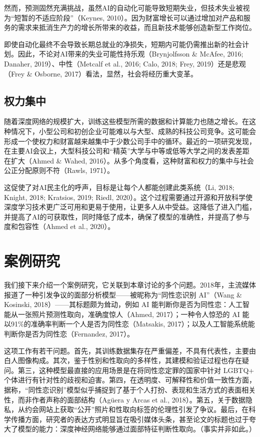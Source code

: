 \documentclass[lang=cn,newtx,10pt,scheme=chinese]{elegantbook}
\begin{document}
然而，预测固然充满挑战，虽然AI的自动化可能导致短期失业，但技术失业被视为“短暂的不适应阶段”（Keynes, 2010）。因为财富增长可以通过增加对产品和服务的需求来抵消生产力的增长所带来的收益，而且新技术能够创造新型工作岗位。

即使自动化最终不会导致长期总就业的净损失，短期内可能仍需推出新的社会计划。因此，不论对AI带来的失业可能性持乐观（Brynjolfsson \& McAfee, 2016; Danaher, 2019）、中性（Metcalf et al., 2016; Calo, 2018; Frey, 2019）还是悲观（Frey \& Osborne, 2017）看法，显然，社会将经历重大变革。

\subsection{权力集中}
随着深度网络的规模扩大，训练这些模型所需的数据和计算能力也随之增长。在这种情况下，小型公司和初创企业可能难以与大型、成熟的科技公司竞争。这可能会形成一个使权力和财富越来越集中于少数公司手中的循环。最近的一项研究发现，在主要AI会议上，大型科技公司和“精英”大学与中等或低等大学之间的发表差距在扩大（Ahmed \& Wahed, 2016）。从多个角度看，这种财富和权力的集中与社会公正分配原则不符（Rawls, 1971）。

这促使了对AI民主化的呼声，目标是让每个人都能创建此类系统（Li, 2018; Knight, 2018; Kratsios, 2019; Riedl, 2020）。这个过程需要通过开源和开放科学使深度学习技术更广泛可用和更易于使用，让更多人从中受益。这降低了进入门槛，并提高了AI的可获取性，同时降低了成本，确保了模型的准确性，并提高了参与度和包容性（Ahmed et al., 2020）。

\section{案例研究}
我们接下来介绍一个案例研究，它关联到本章讨论的多个问题。2018年，主流媒体报道了一种引发争议的面部分析模型——被昵称为“同性恋识别 AI”（Wang \& Kosinski, 2018）——其标题颇为耸动，例如 AI 能判断你是否为同性恋：人工智能从一张照片预测性取向，准确度惊人（Ahmed, 2017）；一种令人惊恐的 AI 能以91\%的准确率判断一个人是否为同性恋（Matsakis, 2017）；以及人工智能系统能判断你是否为同性恋（Fernandez, 2017）。

这项工作有若干问题。首先，其训练数据集存在严重偏差，不具有代表性，主要由白人图像构成。其次，鉴于性别和性取向的多样性，其建模和验证过程也存在疑问。第三，这种模型最直接的应用场景是在将同性恋定罪的国家中针对 LGBTQ+ 个体进行有针对性的歧视和迫害。第四，在透明度、可解释性和价值一致性方面，据称，“同性恋识别”模型似乎捕捉到了基于个人打扮、表现和生活方式的表面相关性，而非作者声称的面部结构（Agüera y Arcas et al., 2018）。第五，关于数据隐私，从约会网站上获取“公开”照片和性取向标签的伦理性引发了争议。最后，在科学传播方面，研究者的表达方式明显旨在吸引媒体头条，甚至论文的标题也过于夸大了模型的能力：深度神经网络能够通过面部特征判断性取向。（事实并非如此。）
\end{document}
